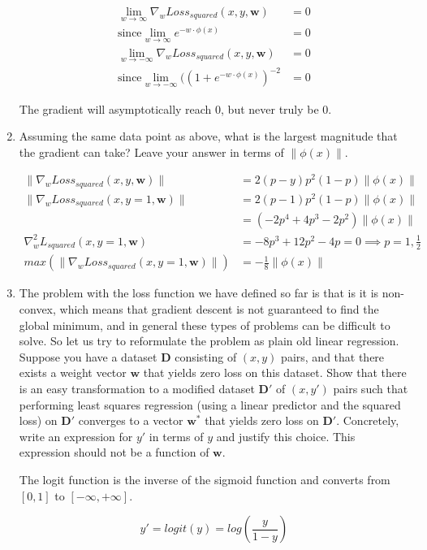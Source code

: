 \documentclass[10pt]{article}
\begin{document}
\begin{enumerate}[label=(\alph*)]
  \begin{align*}
  \lim_{w \to \infty} \nabla_w Loss_{squared} (x, y, \mathbf{w}) &= 0\\
  \text{since} \lim_{w \to \infty} e^{-w \cdot \phi(x)} &= 0\\
  \lim_{w \to -\infty} \nabla_w Loss_{squared} (x, y, \mathbf{w}) &= 0\\
  \text{since} \lim_{w \to -\infty} ((1 + e^{-w \cdot \phi(x)})^{-2} &= 0
  \end{align*}
  
  The gradient will asymptotically reach 0, but never truly be 0.
  
  \item  Assuming the same data point as above, what is the largest magnitude that the gradient can take? Leave your answer in terms of $\lVert \phi(x) \rVert$.

  \begin{align*}
  \lVert \nabla_w Loss_{squared} (x, y, \mathbf{w}) \rVert &= 2(p - y) p^2 (1 - p) \lVert \phi(x) \rVert\\
  \lVert \nabla_w Loss_{squared} (x, y = 1, \mathbf{w}) \rVert &= 2(p - 1) p^2 (1 - p) \lVert \phi(x) \rVert\\
  &= (-2p^4 + 4p^3 -2p^2) \lVert \phi(x) \rVert\\
  \nabla_w^2 L_{squared} (x, y = 1, \mathbf{w}) &= -8p^3 + 12p^2 - 4p = 0 \implies p = 1, \frac{1}{2}\\
  max(\lVert \nabla_w Loss_{squared} (x, y = 1, \mathbf{w}) \rVert) &= -\frac{1}{8} \lVert \phi(x) \rVert
  \end{align*}
  
  \item The problem with the loss function we have defined so far is that is it is non-convex, which means that gradient descent is not guaranteed to find the global minimum, and in general these types of problems can be difficult to solve. So let us try to reformulate the problem as plain old linear regression. Suppose you have a dataset $\mathbf{D}$ consisting of $(x,y)$ pairs, and that there exists a weight vector $\mathbf{w}$ that yields zero loss on this dataset. Show that there is an easy transformation to a modified dataset $\mathbf{D'}$ of $(x,y')$ pairs such that performing least squares regression (using a linear predictor and the squared loss) on $\mathbf{D'}$ converges to a vector $\mathbf{w^*}$ that yields zero loss on $\mathbf{D'}$. Concretely, write an expression for $y'$ in terms of $y$ and justify this choice. This expression should not be a function of $\mathbf{w}$.
  
  The logit function is the inverse of the sigmoid function and converts from $[0,1]$ to $[-\infty,+\infty]$.
  
  $$y' = logit(y) = log(\frac{y}{1 - y})$$

\end{enumerate}
\end{document}
